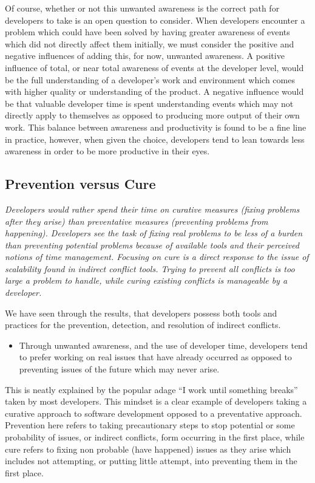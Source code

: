 \documentclass[conference]{IEEEtran}
\begin{document}
Of course, whether or not this unwanted awareness is the correct path for developers to take is an open question to consider. When
developers encounter a problem which could have been solved by having greater awareness of events which did not directly affect
them initially, we must consider the positive and negative influences of adding this, for now, unwanted awareness. A positive
influence of total, or near total
awareness of events at the developer level, would be the full understanding of a developer's work and environment which comes
with higher quality or understanding of the product.
A negative influence would be that valuable developer time is spent understanding events which may not directly apply to themselves as opposed to
producing more output of their own work. This balance between awareness and productivity is found to be a fine line in practice,
however, when given the choice, developers tend to lean towards less awareness in order to be more productive in their eyes.

\subsection{Prevention versus Cure}

\textit{Developers would rather spend their time on curative measures (fixing problems after they
arise) than preventative measures (preventing problems from happening). Developers see the task of fixing real problems
to be less of a burden than preventing potential problems because of available tools and their perceived notions of time management.
Focusing on cure is a direct response to the issue of scalability found in indirect conflict tools. Trying to prevent all conflicts 
is too large a problem to handle, while curing existing conflicts is manageable by a developer.}

We have seen through the results, that developers possess both tools and practices for the prevention,
detection, and resolution of indirect conflicts. 

\begin{itemize}
	\item Through unwanted awareness, and the use of developer time,
				developers tend to prefer working on real issues that have already occurred as opposed to preventing issues of the future which
				may never arise.
\end{itemize}

This is neatly explained by the popular adage ``I work until something breaks'' taken by most developers. This mindset
is a clear example of developers taking a curative approach to software development opposed to a preventative approach.
Prevention here refers to taking precautionary steps to stop potential or some probability of issues, or indirect conflicts, form occurring in the first
place, while cure refers to fixing non probable (have happened) issues as they arise which includes not attempting, or putting little attempt, into preventing
them in the first place.
\end{document}
